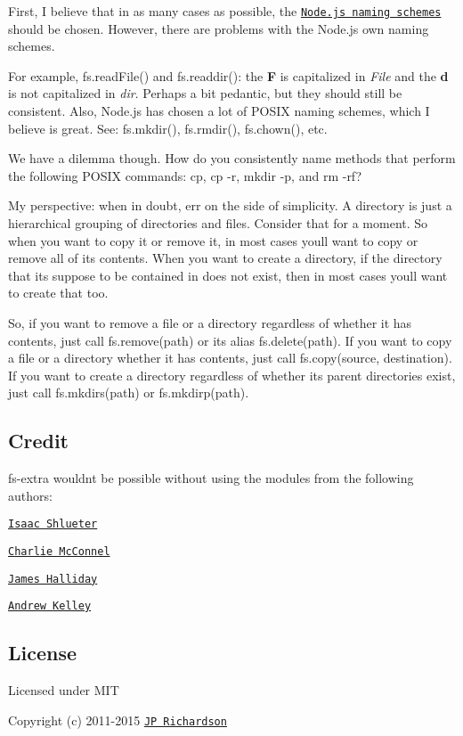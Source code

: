 First, I believe that in as many cases as possible, the \href{http://nodejs.org/api/fs.html}{\tt Node.\+js naming schemes} should be chosen. However, there are problems with the Node.\+js own naming schemes.

For example, {\ttfamily fs.\+read\+File()} and {\ttfamily fs.\+readdir()}\+: the {\bfseries F} is capitalized in {\itshape File} and the {\bfseries d} is not capitalized in {\itshape dir}. Perhaps a bit pedantic, but they should still be consistent. Also, Node.\+js has chosen a lot of P\+O\+S\+I\+X naming schemes, which I believe is great. See\+: {\ttfamily fs.\+mkdir()}, {\ttfamily fs.\+rmdir()}, {\ttfamily fs.\+chown()}, etc.

We have a dilemma though. How do you consistently name methods that perform the following P\+O\+S\+I\+X commands\+: {\ttfamily cp}, {\ttfamily cp -\/r}, {\ttfamily mkdir -\/p}, and {\ttfamily rm -\/rf}?

My perspective\+: when in doubt, err on the side of simplicity. A directory is just a hierarchical grouping of directories and files. Consider that for a moment. So when you want to copy it or remove it, in most cases you\textquotesingle{}ll want to copy or remove all of its contents. When you want to create a directory, if the directory that it\textquotesingle{}s suppose to be contained in does not exist, then in most cases you\textquotesingle{}ll want to create that too.

So, if you want to remove a file or a directory regardless of whether it has contents, just call {\ttfamily fs.\+remove(path)} or its alias {\ttfamily fs.\+delete(path)}. If you want to copy a file or a directory whether it has contents, just call {\ttfamily fs.\+copy(source, destination)}. If you want to create a directory regardless of whether its parent directories exist, just call {\ttfamily fs.\+mkdirs(path)} or {\ttfamily fs.\+mkdirp(path)}.

\subsection*{Credit }

{\ttfamily fs-\/extra} wouldn\textquotesingle{}t be possible without using the modules from the following authors\+:


\begin{DoxyItemize}
\item \href{https://github.com/isaacs}{\tt Isaac Shlueter}
\item \href{https://github.com/avianflu}{\tt Charlie Mc\+Connel}
\item \href{https://github.com/substack}{\tt James Halliday}
\item \href{https://github.com/andrewrk}{\tt Andrew Kelley}
\end{DoxyItemize}

\subsection*{License }

Licensed under M\+I\+T

Copyright (c) 2011-\/2015 \href{https://github.com/jprichardson}{\tt J\+P Richardson} 